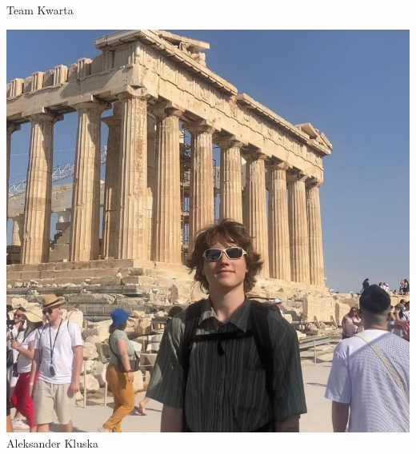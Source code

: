 \begin{frame}[t]{Team Kwarta}
\begin{minipage}{0.22\linewidth}
\includegraphics[width=\linewidth]{img/AK}\\
\scriptsize Aleksander Kluska \\
\scriptsize {}
\end{minipage}

\vspace{1.5em}\pause


\end{frame}
